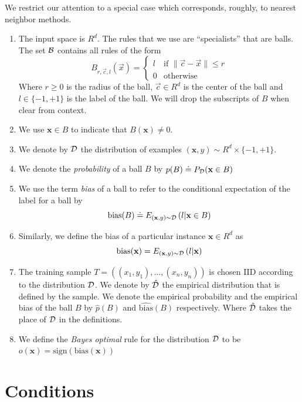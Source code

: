 \documentclass{article}
\newcommand{\D}{{\cal D}}
\newcommand{\B}{{\cal B}}
\newcommand{\x}{\vec{x}}
\newcommand{\cc}{\vec{c}}
\newcommand{\vx}{\mathbf{x}}
\newcommand{\bias}{\text{bias}}
\newcommand{\ebias}{\widehat{\text{bias}}}
\newcommand{\eD}{\hat{\D}}
\newcommand{\ep}{\hat{p}}
\newcommand{\sign}{\text{sign}}
\begin{document}
We restrict our attention to a special case which corresponds,
roughly, to nearest neighbor methods.
\begin{enumerate}
  \item The input space is $R^d$.
    The rules that we use are ``specialists'' that are balls. The set
    $\B$ contains all rules of the form 
    \[
    B_{r,\cc,l}(\x) =
    \begin{cases}
      l & \text{if } \| \cc- \x \| \leq r \\
    0 & \text{otherwise }
    \end{cases}
    \]
    Where $r \geq 0$ is the radius of the ball, $\cc \in R^d$ is the
    center of the ball and $l \in \{-1,+1\}$ is the label of the ball.
    We will drop the subscripts of $B$ when clear from context.
  \item
    We use $\vx \in B$ to indicate that $B(\vx) \neq 0$.
  \item
    We denote by $\D$ the distribution of examples $(\vx,y) \sim R^d
    \times \{-1,+1\}$.
  \item
    We denote the {\em probability} of a ball $B$ by $p(B) \doteq
    P_{\D}(\vx \in B)$
  \item
    We use the term {\em bias} of a ball to refer to the conditional
    expectation of the label for a ball by
    $$
    \bias(B) \doteq E_{(\vx,y)\sim\D}\left( l|\vx \in B \right)
    $$
  \item
    Similarly, we define the bias of a particular instance $\vx \in
    R^d$ as
    $$
    \bias(\vx) = E_{(\vx,y)\sim\D}\left( l|\vx \right)
    $$
  \item
    The training sample $T=((x_1,y_1),\ldots,(x_n,y_n))$ is chosen IID
    according to the distribution $\D$. We denote by $\eD$ the
    empirical distribution that is defined by the sample. We denote
    the empirical probability and the empirical bias of the ball $B$
    by $\ep(B)$ and $\ebias(B)$ respectively. Where $\eD$ takes the
    place of $\D$ in the definitions.
  \item
    We define the {\em Bayes optimal} rule for the distribution $\D$
    to be $o(\vx) = \sign(\bias(\vx))$
\end{enumerate}

\section{Conditions}
\end{document}
